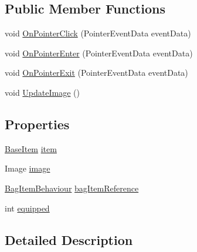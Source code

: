 \subsection*{Public Member Functions}
\begin{DoxyCompactItemize}
\item 
void \mbox{\hyperlink{class_bag_item_behaviour_a81455fb5bdcd5a14ca9440c0f9581708}{On\+Pointer\+Click}} (Pointer\+Event\+Data event\+Data)
\item 
void \mbox{\hyperlink{class_bag_item_behaviour_a9dd6c0fb07dd87363f0198070a16cff7}{On\+Pointer\+Enter}} (Pointer\+Event\+Data event\+Data)
\item 
void \mbox{\hyperlink{class_bag_item_behaviour_a94a401c7a518b7ed17e5648153d6f1b6}{On\+Pointer\+Exit}} (Pointer\+Event\+Data event\+Data)
\item 
void \mbox{\hyperlink{class_bag_item_behaviour_aaedcc49f5d2def63dcde17d72fdb3b9d}{Update\+Image}} ()
\end{DoxyCompactItemize}
\subsection*{Properties}
\begin{DoxyCompactItemize}
\item 
\mbox{\hyperlink{class_base_item}{Base\+Item}} \mbox{\hyperlink{class_bag_item_behaviour_aae12bd30d28c11b793bd8db232e9c2a2}{item}}
\item 
Image \mbox{\hyperlink{class_bag_item_behaviour_a10d2d4e2b468574fb4f922da7f300cbc}{image}}
\item 
\mbox{\hyperlink{class_bag_item_behaviour}{Bag\+Item\+Behaviour}} \mbox{\hyperlink{class_bag_item_behaviour_a804cf27502bc5bb77a2fa80e178903db}{bag\+Item\+Reference}}
\item 
int \mbox{\hyperlink{class_bag_item_behaviour_a7772dc51a9cde63e29f6a683f8fbb451}{equipped}}
\end{DoxyCompactItemize}


\subsection{Detailed Description}


